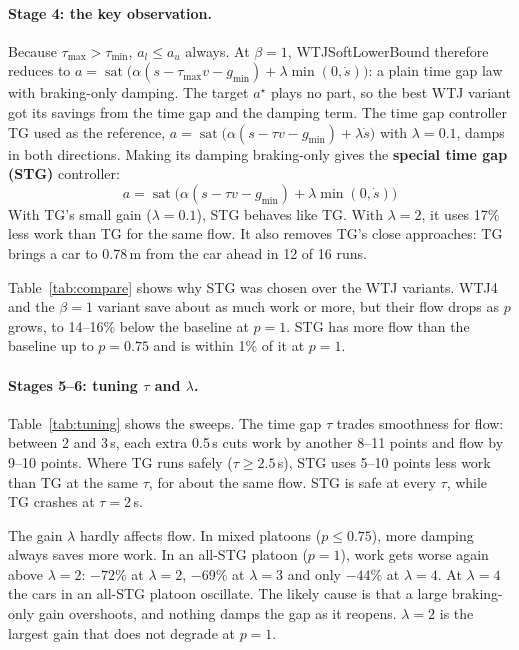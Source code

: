 \documentclass[11pt]{article}
\newcommand{\sat}{\operatorname{sat}}
\begin{document}
\paragraph{Stage 4: the key observation.}
Because $\tau_{\max}>\tau_{\min}$, $a_l\le a_u$ always. At $\beta=1$, WTJSoftLowerBound therefore reduces to
$a=\sat\big(\alpha(s-\tau_{\max}v-g_{\min})+\lambda\min(0,\dot s)\big)$: a plain time gap law with
braking-only damping. The target $a^\star$ plays no part, so the best WTJ variant got its savings from the
time gap and the damping term. The time gap controller TG used as the reference,
$a=\sat\big(\alpha(s-\tau v-g_{\min})+\lambda\dot s\big)$ with $\lambda=0.1$, damps in both directions.
Making its damping braking-only gives the \textbf{special time gap (STG)} controller:
\begin{equation}
\boxed{a = \sat\!\big(\alpha(s - \tau v - g_{\min}) + \lambda\min(0,\dot s)\big)}
\end{equation}
With TG's small gain ($\lambda=0.1$), STG behaves like TG. With $\lambda=2$, it uses 17\% less work than
TG for the same flow. It also removes TG's close approaches: TG brings a car to 0.78\,m from the car ahead
in 12 of 16 runs.

Table~\ref{tab:compare} shows why STG was chosen over the WTJ variants. WTJ4 and the $\beta=1$ variant
save about as much work or more, but their flow drops as $p$ grows, to 14--16\% below the baseline at
$p=1$. STG has more flow than the baseline up to $p=0.75$ and is within 1\% of it at $p=1$.



\paragraph{Stages 5--6: tuning $\tau$ and $\lambda$.}
Table~\ref{tab:tuning} shows the sweeps. The time gap $\tau$ trades smoothness for flow: between 2 and
3\,s, each extra 0.5\,s cuts work by another 8--11 points and flow by 9--10 points. Where TG runs safely
($\tau\ge2.5$\,s), STG uses 5--10 points less work than TG at the same $\tau$, for about the same flow. STG
is safe at every $\tau$, while TG crashes at $\tau=2$\,s.

The gain $\lambda$ hardly affects flow. In mixed platoons ($p\le0.75$), more damping always saves more
work. In an all-STG platoon ($p=1$), work gets worse again above $\lambda=2$: $-72\%$ at $\lambda=2$, $-69\%$
at $\lambda=3$ and only $-44\%$ at $\lambda=4$. At $\lambda=4$ the cars in an all-STG platoon oscillate.
The likely cause is that a large braking-only gain overshoots, and nothing damps the gap as it reopens.
$\lambda=2$ is the largest gain that does not degrade at $p=1$.
\end{document}
